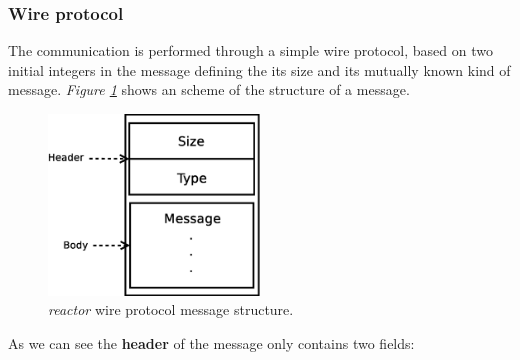 \subsubsection{Wire protocol}
\label{sec:wire}
The communication is performed through a simple wire protocol\cite{pcm:wire}, based on two initial integers in the message defining the 
its size and its mutually known kind of message. \emph{Figure \ref{fig:wire}} shows an scheme of the structure of a message.
\begin{figure}[t]
  \centering
  \includegraphics[width=0.5\textwidth,keepaspectratio]{img/wire}
  \caption{\emph{reactor} wire protocol message structure.}
  \label{fig:wire}
\end{figure}
As we can see the {\bf header} of the message only contains two fields:
